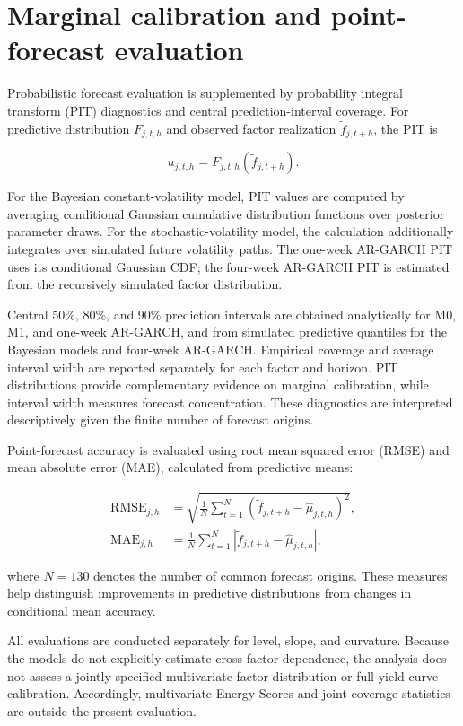 \documentclass[
  12pt,
  letterpaper,
  DIV=11,
  numbers=noendperiod]{scrreprt}
\begin{document}
\section{Marginal calibration and point-forecast
evaluation}\label{marginal-calibration-and-point-forecast-evaluation}

Probabilistic forecast evaluation is supplemented by probability
integral transform (PIT) diagnostics and central prediction-interval
coverage. For predictive distribution \(F_{j,t,h}\) and observed factor
realization \(\tilde f_{j,t+h}\), the PIT is

\[
u_{j,t,h}
=F_{j,t,h}(\tilde f_{j,t+h}).
\]

For the Bayesian constant-volatility model, PIT values are computed by
averaging conditional Gaussian cumulative distribution functions over
posterior parameter draws. For the stochastic-volatility model, the
calculation additionally integrates over simulated future volatility
paths. The one-week AR-GARCH PIT uses its conditional Gaussian CDF; the
four-week AR-GARCH PIT is estimated from the recursively simulated
factor distribution.

Central 50\%, 80\%, and 90\% prediction intervals are obtained
analytically for M0, M1, and one-week AR-GARCH, and from simulated
predictive quantiles for the Bayesian models and four-week AR-GARCH.
Empirical coverage and average interval width are reported separately
for each factor and horizon. PIT distributions provide complementary
evidence on marginal calibration, while interval width measures forecast
concentration. These diagnostics are interpreted descriptively given the
finite number of forecast origins.

Point-forecast accuracy is evaluated using root mean squared error
(RMSE) and mean absolute error (MAE), calculated from predictive means:

\[
\begin{aligned}
\operatorname{RMSE}_{j,h}
&=\sqrt{\frac{1}{N}\sum_{t=1}^{N}
\left(\tilde f_{j,t+h}-\widehat\mu_{j,t,h}\right)^2},\\
\operatorname{MAE}_{j,h}
&=\frac{1}{N}\sum_{t=1}^{N}
\left|\tilde f_{j,t+h}-\widehat\mu_{j,t,h}\right|,
\end{aligned}
\]

where \(N=130\) denotes the number of common forecast origins. These
measures help distinguish improvements in predictive distributions from
changes in conditional mean accuracy.

All evaluations are conducted separately for level, slope, and
curvature. Because the models do not explicitly estimate cross-factor
dependence, the analysis does not assess a jointly specified
multivariate factor distribution or full yield-curve calibration.
Accordingly, multivariate Energy Scores and joint coverage statistics
are outside the present evaluation.
\end{document}
